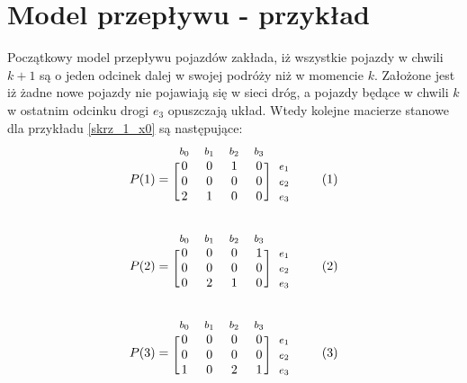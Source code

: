 \documentclass[12pt]{book}
\newcommand\addtag{\refstepcounter{equation}
\renewcommand{\labelenumii}{\theenumii}
\renewcommand{\theenumii}{\theenumi.\arabic{enumii}.}
\tag{\theequation}}
\begin{document}
\section{Model przepływu - przykład}
Początkowy model przepływu pojazdów zakłada, iż wszystkie pojazdy w chwili $k+1$ są o jeden odcinek dalej w swojej podróży niż w momencie $k$. Założone jest iż żadne nowe pojazdy nie pojawiają się w sieci dróg, a pojazdy będące w chwili $k$ w ostatnim odcinku drogi $e_3$ opuszczają układ. Wtedy kolejne macierze stanowe dla przykładu \ref{skrz_1_x0} są następujące:
\begin{equation*}
  P(1)=
  \begin{blockarray}{*{4}{c} l}
    \begin{block}{*{4}{>{$\footnotesize}c<{$}} l}
      $b_0$ & $b_1$  & $b_2$ & $b_3$ \\
    \end{block}
    \begin{block}{[*{4}{c}]>{$\footnotesize}l<{$}}
       0 & 0 & 1 & 0 & $e_1$ \\
       0 & 0 & 0 & 0 & $e_2$ \\
       2 & 1 & 0 & 0 & $e_3$ \\
    \end{block}
  \end{blockarray} \addtag
\end{equation*}

\begin{equation*}
  P(2)=
  \begin{blockarray}{*{4}{c} l}
    \begin{block}{*{4}{>{$\footnotesize}c<{$}} l}
      $b_0$ & $b_1$ & $b_2$ & $b_3$  \\
    \end{block}
    \begin{block}{[*{4}{c}]>{$\footnotesize}l<{$}}
       0 & 0 & 0 & 1 & $e_1$ \\
       0 & 0 & 0 & 0 & $e_2$ \\
       0 & 2 & 1 & 0 & $e_3$ \\
    \end{block}
  \end{blockarray} \addtag
\end{equation*}


\begin{equation*}
  P(3)=
  \begin{blockarray}{*{4}{c} l}
    \begin{block}{*{4}{>{$\footnotesize}c<{$}} l}
      $b_0$ & $b_1$ & $b_2$ & $b_3$ \\
    \end{block}
    \begin{block}{[*{4}{c}]>{$\footnotesize}l<{$}}
       0 & 0 & 0 & 0 & $e_1$ \\
       0 & 0 & 0 & 0 & $e_2$ \\
       1 & 0 & 2 & 1 & $e_3$ \\
    \end{block}
  \end{blockarray} \addtag
\end{equation*}
\end{document}
